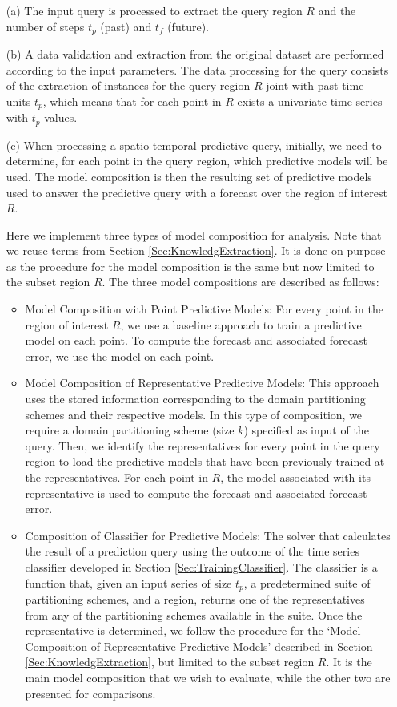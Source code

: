 \begin{itemize}
 \item [(a)] The input query is processed to extract the query region $R$ and the number of steps $t_p$ (past) and $t_f$ (future).
 \item [(b)] A data validation and extraction from the original dataset are performed according to the input parameters. The data processing for the query consists of the extraction of instances for the query region $R$ joint with past time units $t_{p}$, which means that for each point in $R$ exists a univariate time-series with $t_{p}$ values.
 \item [(c)] When processing a spatio-temporal predictive query, initially, we need to determine, for each point in the query region, which predictive models will be used. The model composition is then the resulting set of predictive models used to answer the predictive query with a forecast over the region of interest $R$. 
 
 Here we implement three types of model composition for analysis. Note that we reuse terms from Section \ref{Sec:KnowledgExtraction}. It is done on purpose as the procedure for the model composition is the same but now limited to the subset region $R$. The three model compositions are described as follows:

 \begin{itemize}
	\item Model Composition with Point Predictive Models: For every point in the region of interest $R$, we use a baseline approach to train a predictive model on each point. To compute the forecast and associated forecast error, we use the model on each point.

	\item Model Composition of Representative Predictive Models: This approach uses the stored information corresponding to the domain partitioning schemes and their respective models. In this type of composition, we require a domain partitioning scheme (size $k$) specified as input of the query. Then, we identify the representatives for every point in the query region to load the predictive models that have been previously trained at the representatives. For each point in $R$, the model associated with its representative is used to compute the forecast and associated forecast error.
	
	\item Composition of Classifier for Predictive Models: The solver that calculates the result of a prediction query using the outcome of the time series classifier developed in Section \ref{Sec:TrainingClassifier}. The classifier is a function that, given an input series of size $t_p$, a predetermined suite of partitioning schemes, and a region, returns one of the representatives from any of the partitioning schemes available in the suite. Once the representative is determined, we follow the procedure for the `Model Composition of Representative Predictive Models' described in Section \ref{Sec:KnowledgExtraction}, but limited to the subset region $R$. It is the main model composition that we wish to evaluate, while the other two are presented for comparisons.
\end{itemize}
 

\end{itemize}
